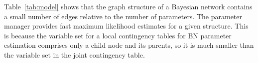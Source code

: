 \documentclass{acm_proc_article-sp}
\begin{document}
Table~\ref{tab:model} shows that the graph structure of a Bayesian network contains a small number of edges relative to the number of parameters. 
The parameter manager provides fast maximum likelihood estimates for a given structure. This is because the variable set for a local contingency tables for BN parameter estimation comprises only a child node and its parents, so it is much smaller than the variable set in the joint contingency table.


\begin{table}[htbp]
  \centering
        \caption{Model Manager Evaluation.}
  \label{tab:model}%
\end{table}%
\end{document}
